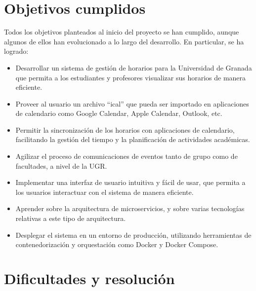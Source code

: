 \section{Objetivos cumplidos}
Todos los objetivos planteados al inicio del proyecto se han cumplido, aunque algunos de ellos han evolucionado a lo largo del desarrollo. En particular, se ha logrado:
\begin{itemize}
    \item Desarrollar un sistema de gestión de horarios para la Universidad de Granada que permita a los estudiantes y profesores visualizar sus horarios de manera eficiente.
    \item Proveer al usuario un archivo ``ical'' que pueda ser importado en aplicaciones de calendario como Google Calendar, Apple Calendar, Outlook, etc.
    \item Permitir la sincronización de los horarios con aplicaciones de calendario, facilitando la gestión del tiempo y la planificación de actividades académicas.
    \item Agilizar el proceso de comunicaciones de eventos tanto de grupo como de facultades, a nivel de la UGR.
    \item Implementar una interfaz de usuario intuitiva y fácil de usar, que permita a los usuarios interactuar con el sistema de manera eficiente.
    \item Aprender sobre la arquitectura de microservicios, y sobre varias tecnologías relativas a este tipo de arquitectura.
    \item Desplegar el sistema en un entorno de producción, utilizando herramientas de contenedorización y orquestación como Docker y Docker Compose.
\end{itemize}

\section{Dificultades y resolución}

